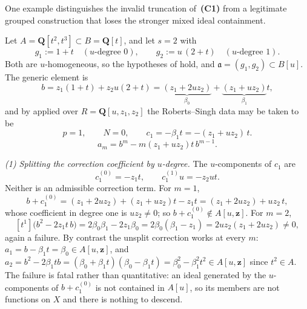 \begin{example}
\label{ex:ch44-splitting-fails}
One example distinguishes the invalid truncation of
\,\textbf{(C1)} from a legitimate grouped
construction that loses the stronger mixed ideal containment.

Let $A=\mathbf Q[t^2,t^3]\subset B=\mathbf Q[t]$, and let
$s=2$ with
\[
 g_1:=1+t
 \quad(u\text{-degree }0),
 \qquad
 g_2:=u\,(2+t)
 \quad(u\text{-degree }1).
\]
Both are $u$-homogeneous, so the hypotheses of
 hold, and
$\mathfrak a=(g_1,g_2)\subset B[u]$.  The generic element is
\[
 b=z_1(1+t)+z_2u(2+t)
 =\underbrace{(z_1+2uz_2)}_{\beta_0}
  +\underbrace{(z_1+uz_2)}_{\beta_1}t,
\]
and by  applied over
$R=\mathbf Q[u,z_1,z_2]$ the Roberts--Singh data may be taken to be
\[
 p=1,
 \qquad
 N=0,
 \qquad
 c_1=-\beta_1t=-(z_1+uz_2)\,t.
\]
\[
 a_m=b^m-m(z_1+uz_2)t\,b^{m-1}.
\]

\smallskip
\emph{(1) Splitting the correction coefficient by $u$-degree.}
The $u$-components of $c_1$ are
\[
 c_1^{(0)}=-z_1t,
 \qquad
 c_1^{(1)}u=-z_2ut .
\]
Neither is an admissible correction term.  For $m=1$,
\[
 b+c_1^{(0)}
 =(z_1+2uz_2)+(z_1+uz_2)t-z_1t
 =(z_1+2uz_2)+uz_2\,t,
\]
whose coefficient in degree one is $uz_2\ne0$; so
$b+c_1^{(0)}\notin A[u,\mathbf z]$.  For $m=2$,
\[
 [t^1]\bigl(b^2-2z_1t\,b\bigr)
 =2\beta_0\beta_1-2z_1\beta_0
 =2\beta_0(\beta_1-z_1)
 =2uz_2(z_1+2uz_2)\ne0,
\]
again a failure.  By contrast the unsplit correction works at every $m$:
$a_1=b-\beta_1t=\beta_0\in A[u,\mathbf z]$, and
$a_2=b^2-2\beta_1tb=(\beta_0+\beta_1t)(\beta_0-\beta_1t)
=\beta_0^2-\beta_1^2t^2\in A[u,\mathbf z]$ since $t^2\in A$.
The failure is fatal rather than quantitative: an ideal generated by the
$u$-components of $b+c_1^{(0)}$ is not contained in $A[u]$, so its
members are not functions on $X$ and there is nothing to descend.


\end{example}
